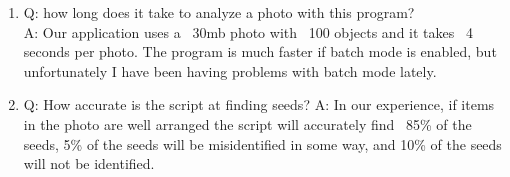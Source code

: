 \documentclass[12pt]{article}
\begin{document}
\begin{enumerate}

\item Q: how long does it take to analyze a photo with this program?\\
\noindent A: Our application uses a ~30mb photo with ~100 objects and it takes ~4 seconds per photo. The program is much faster if batch mode is enabled, but unfortunately I have been having problems with batch mode lately.

\item Q: How accurate is the script at finding seeds?
A: In our experience, if items in the photo are well arranged the script will accurately find ~85\% of the seeds, 5\% of the seeds will be misidentified in some way, and 10\% of the seeds will not be identified.

\end{enumerate}




\printindex
\end{document}
